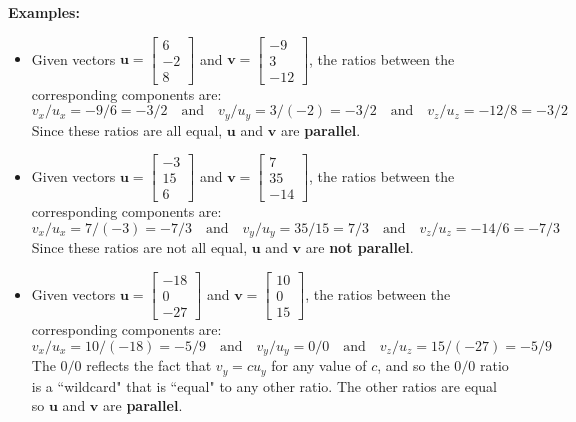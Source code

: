 \documentclass{article}
\begin{document}
\textbf{Examples:}
\begin{itemize}
\item Given vectors \(\mathbf{u} = \begin{bmatrix} 6 \\ -2 \\ 8 \end{bmatrix}\) and \(\mathbf{v} = \begin{bmatrix} -9 \\ 3 \\ -12 \end{bmatrix}\), the ratios between the corresponding components are: 
\[v_x/u_x = -9/6 = -3/2 \quad\text{and}\quad v_y/u_y = 3/(-2) = -3/2 \quad\text{and}\quad v_z/u_z = -12/8 = -3/2\]
Since these ratios are all equal, \(\mathbf{u}\) and \(\mathbf{v}\) are {\bf parallel}.
\item Given vectors \(\mathbf{u} = \begin{bmatrix} -3 \\ 15 \\ 6 \end{bmatrix}\) and \(\mathbf{v} = \begin{bmatrix} 7 \\ 35 \\ -14 \end{bmatrix}\), the ratios between the corresponding components are:
\[v_x/u_x = 7/(-3) = -7/3 \quad\text{and}\quad v_y/u_y = 35/15 = 7/3 \quad\text{and}\quad v_z/u_z = -14/6 = -7/3\]    
Since these ratios are not all equal, \(\mathbf{u}\) and \(\mathbf{v}\) are {\bf not parallel}.
\item Given vectors \(\mathbf{u} = \begin{bmatrix} -18 \\ 0 \\ -27 \end{bmatrix}\) and \(\mathbf{v} = \begin{bmatrix} 10 \\ 0 \\ 15 \end{bmatrix}\), the ratios between the corresponding components are:
\[v_x/u_x = 10/(-18) = -5/9 \quad\text{and}\quad v_y/u_y = 0/0 \quad\text{and}\quad v_z/u_z = 15/(-27) = -5/9\]
The \(0/0\) reflects the fact that \(v_y = c u_y\) for any value of \(c\), and so the \(0/0\) ratio is a ``wildcard" that is ``equal" to any other ratio. The other ratios are equal so \(\mathbf{u}\) and \(\mathbf{v}\) are {\bf parallel}.

\end{itemize}
\end{document}
